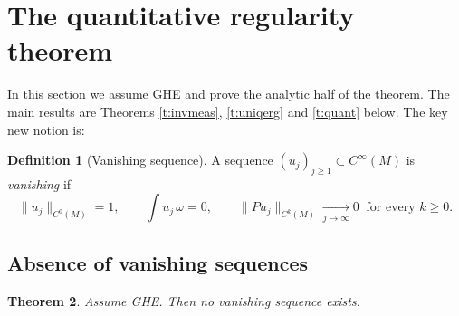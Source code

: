 \documentclass[11pt]{amsart}
\theoremstyle{plain}
\newtheorem{theorem}{Theorem}[section]
\theoremstyle{definition}
\newtheorem{definition}[theorem]{Definition}
\theoremstyle{remark}
\begin{document}
\section{The quantitative regularity theorem}\label{s:quant}

In this section we assume GHE and prove the analytic half of the
theorem.  The main results are Theorems \ref{t:invmeas}, \ref{t:uniqerg}
and \ref{t:quant} below.  The key new notion is:

\begin{definition}[Vanishing sequence]\label{d:vanish}
A sequence $(u_j)_{j\ge1}\subset C^\infty(M)$ is \emph{vanishing} if
\[
\|u_j\|_{C^0(M)}=1,\qquad
\int u_j\,\omega=0,\qquad
\|Pu_j\|_{C^{k}(M)}\xrightarrow[j\to\infty]{}0
\ \text{ for every } k\ge 0 .
\]
\end{definition}

\subsection{Absence of vanishing sequences}

\begin{theorem}\label{t:vanish}
Assume GHE.  Then no vanishing sequence exists.
\end{theorem}
\end{document}
